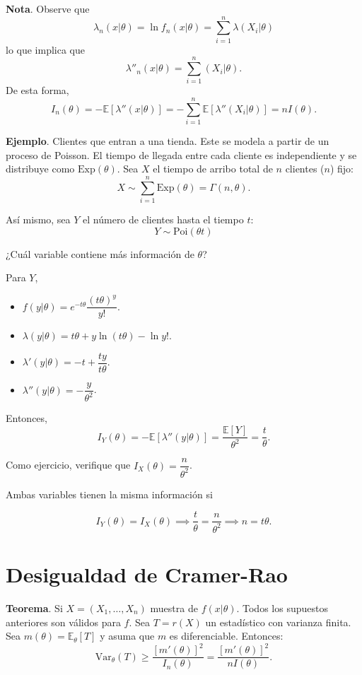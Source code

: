 \documentclass[
  12pt,
]{book}
\begin{document}
\textbf{Nota}. Observe que
\[\lambda_n(x|\theta) = \ln f_n(x|\theta) = \sum_{i=1}^{n} \lambda(X_i|\theta)\]
lo que implica que
\[\lambda''_n(x|\theta) = \sum_{i=1}^n(X_i|\theta).\]
De esta forma,
\[I_n(\theta) = -\mathbb E[\lambda''(x|\theta)] = - \sum_{i=1}^n\mathbb E[\lambda''(X_i|\theta)] = nI(\theta).\]

\textbf{Ejemplo}. Clientes que entran a una tienda. Este se modela a partir de un proceso de Poisson. El tiempo de llegada entre cada cliente es independiente y se distribuye como \(\text{Exp}(\theta)\). Sea \(X\) el tiempo de arribo total de \(n\) clientes (\(n\)) fijo:
\[X\sim \sum_{i=1}^{n}\text{Exp}(\theta) = \Gamma(n,\theta) .\]

Así mismo, sea \(Y\) el número de clientes hasta el tiempo \(t\):
\[Y\sim \text{Poi}(\theta t)\]

¿Cuál variable contiene más información de \(\theta\)?

Para \(Y\),

\begin{itemize}
\item
  \(f(y|\theta) = e^{-t\theta}\dfrac{(t\theta)^y}{y!}\).
\item
  \(\lambda(y|\theta) = t\theta + y\ln (t\theta) - \ln y!\).
\item
  \(\lambda'(y|\theta) = -t+\dfrac{ty}{t\theta}.\)
\item
  \(\lambda''(y|\theta) = -\dfrac y{\theta^2}\).
\end{itemize}

Entonces,
\[I_Y(\theta) =-\mathbb E[ \lambda''(y|\theta)] = \dfrac{\mathbb E[Y]}{\theta^2} = \dfrac{t}\theta.\]

Como ejercicio, verifique que \(I_X(\theta) = \dfrac n{\theta^2}\).

Ambas variables tienen la misma información si

\[I_Y(\theta) = I_X(\theta) \implies \dfrac t\theta = \dfrac n{\theta^2} \implies n = t\theta.\]

\hypertarget{desigualdad-de-cramer-rao}{%
\section{Desigualdad de Cramer-Rao}\label{desigualdad-de-cramer-rao}}

\textbf{Teorema}. Si \(X = (X_1,\dots, X_n)\) muestra de \(f(x|\theta)\). Todos los supuestos anteriores son válidos para \(f\). Sea \(T = r(X)\) un estadístico con varianza finita. Sea \(m(\theta) = \mathbb E_{\theta}[T]\) y asuma que \(m\) es diferenciable. Entonces:
\[\text{Var}_\theta(T)\geq \dfrac{[m'(\theta)]^2}{I_n(\theta)} =\dfrac{[m'(\theta)]^2}{nI(\theta)} .\]
\end{document}
